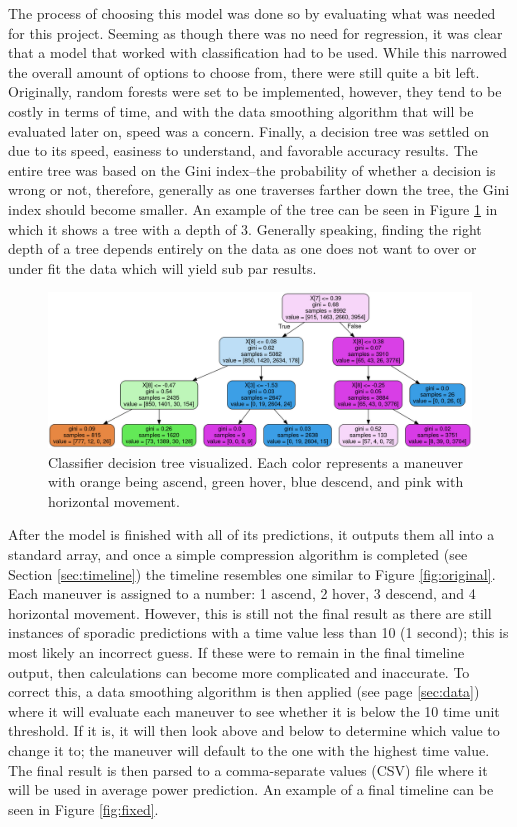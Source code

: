 \documentclass{article}
\begin{document}
The process of choosing this model was done so by evaluating what was needed for this project. Seeming as though there was no need for regression, it was clear that a model that worked with classification had to be used. While this narrowed the overall amount of options to choose from, there were still quite a bit left. Originally, random forests were set to be implemented, however, they tend to be costly in terms of time, and with the data smoothing algorithm that will be evaluated later on, speed was a concern. Finally, a decision tree was settled on due to its speed, easiness to understand, and favorable accuracy results. The entire tree was based on the Gini index–the probability of whether a decision is wrong or not, therefore, generally as one traverses farther down the tree, the Gini index should become smaller. An example of the tree can be seen in Figure \ref{fig:tree} in which it shows a tree with a depth of 3. Generally speaking, finding the right depth of a tree depends entirely on the data as one does not want to over or under fit the data which will yield sub par results. \par

\begin{figure}[!h]
	\centering
	\includegraphics[scale=0.25]{images/tree}
	\caption{Classifier decision tree visualized. Each color represents a maneuver with orange being ascend, green hover, blue descend, and pink with horizontal movement.}
	\label{fig:tree}
\end{figure}

After the model is finished with all of its predictions, it outputs them all into a standard array, and once a simple compression algorithm is completed (see Section \ref{sec:timeline}) the timeline resembles one similar to Figure \ref{fig:original}. Each maneuver is assigned to a number: 1 ascend, 2 hover, 3 descend, and 4 horizontal movement. However, this is still not the final result as there are still instances of sporadic predictions with a time value less than 10 (1 second); this is most likely an incorrect guess. If these were to remain in the final timeline output, then calculations can become more complicated and inaccurate. To correct this, a data smoothing algorithm is then applied (see page \ref{sec:data}) where it will evaluate each maneuver to see whether it is below the 10 time unit threshold. If it is, it will then look above and below to determine which value to change it to; the maneuver will default to the one with the highest time value. The final result is then parsed to a comma-separate values (CSV) file where it will be used in average power prediction. An example of a final timeline can be seen in Figure \ref{fig:fixed}.
\end{document}
